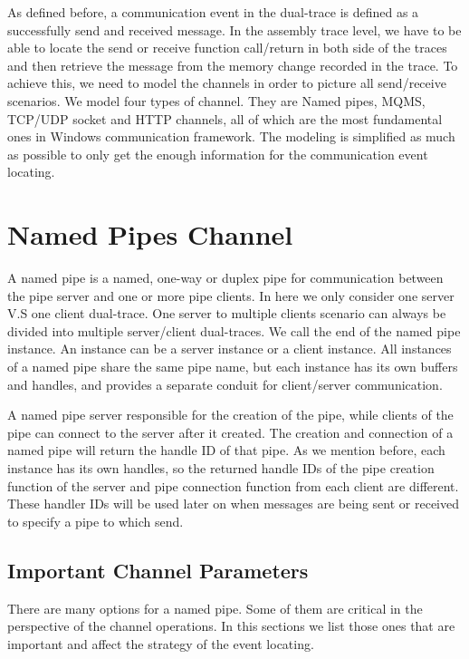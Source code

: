 \label{chapter:Mod}
As defined before, a communication event in the dual-trace is defined as a successfully send and received message. In the assembly trace level, we have to be able to locate the send or receive function call/return in both side of the traces and then retrieve the message from the memory change recorded in the trace. To achieve this, we need to model the channels in order to picture all send/receive scenarios. We model four types of channel. They are Named pipes, MQMS, TCP/UDP socket and HTTP channels, all of which are the most fundamental ones in Windows communication framework. The modeling is simplified as much as possible to only get the enough information for the communication event locating.

\section{Named Pipes Channel}
A named pipe is a named, one-way or duplex pipe for communication between the pipe server and one or more pipe clients. In here we only consider one server V.S one client dual-trace. One server to multiple clients scenario can always be divided into multiple server/client dual-traces. We call the end of the named pipe instance. An instance can be a server instance or a client instance. All instances of a named pipe share the same pipe name, but each instance has its own buffers and handles, and provides a separate conduit for client/server communication. 

A named pipe server responsible for the creation of the pipe, while clients of the pipe can connect to the server after it created. The creation and connection of a named pipe will return the handle ID of that pipe. As we mention before, each instance has its own handles, so the returned handle IDs of the pipe creation function of the server and pipe connection function from each client are different. These handler IDs will be used later on when messages are being sent or received to specify a pipe to which send.


\subsection{Important Channel Parameters}
There are many options for a named pipe. Some of them are critical in the perspective of the channel operations. In this sections we list those ones that are important and affect the strategy of the event locating.
